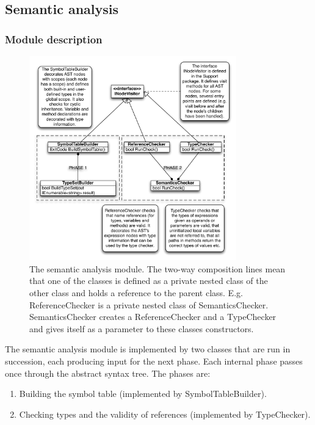 \documentclass[a4paper,11pt]{article}
\begin{document}
\subsection{Semantic analysis}

\subsubsection{Module description}

\begin{figure}[h!]
\centering
\includegraphics[width=0.8\textwidth]{semantic_analysis.pdf}
\caption{The semantic analysis module. The two-way composition lines mean that one of the classes is defined as a private nested class of the other class and holds a reference to the parent class. E.g. ReferenceChecker is a private nested class of SemanticsChecker. SemanticsChecker creates a ReferenceChecker and a TypeChecker and gives itself as a parameter to these classes constructors.} \label{fig:semantic_analysis}
\end{figure}

The semantic analysis module is implemented by two classes that are run in succession, each producing input for the next phase. Each internal phase passes once through the abstract syntax tree. The phases are:

\begin{enumerate}
\item Building the symbol table (implemented by SymbolTableBuilder).
\item Checking types and the validity of references (implemented by TypeChecker).
\end{enumerate}
\end{document}
